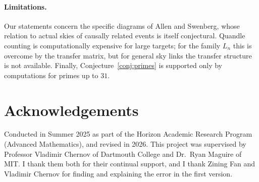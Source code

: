\documentclass[11pt]{article}
\theoremstyle{definition}
\begin{document}
\paragraph{Limitations.} Our statements concern the specific diagrams of Allen and Swenberg, whose
relation to actual skies of causally related events is itself conjectural. Quandle counting is
computationally expensive for large targets; for the family $L_n$ this is overcome by the transfer
matrix, but for general sky links the transfer structure is not available. Finally,
Conjecture~\ref{conj:primes} is supported only by computations for primes up to $31$.

\section*{Acknowledgements}

Conducted in Summer 2025 as part of the Horizon Academic Research Program (Advanced Mathematics), and
revised in 2026. This project was supervised by Professor Vladimir Chernov of Dartmouth College and
Dr.\ Ryan Maguire of MIT. I thank them both for their continual support, and I thank Zining Fan and
Vladimir Chernov for finding and explaining the error in the first version.
\end{document}
